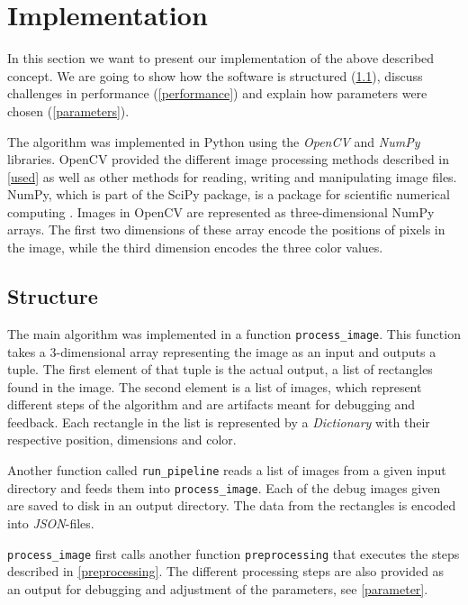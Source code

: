 \section{Implementation}

In this section we want to present our implementation of the above described
concept. We are going to show how the software is structured
(\ref{structure}), discuss challenges in performance (\ref{performance}) and
explain how parameters were chosen (\ref{parameters}).

The algorithm was implemented in Python using the \textit{OpenCV} and
\textit{NumPy} libraries. OpenCV provided the different image processing methods
described in \ref{used} as well as other methods for reading, writing and
manipulating image files. NumPy, which is part of the SciPy package, is a
package for scientific numerical computing \cite{scipy}. Images in OpenCV are
represented as three-dimensional NumPy arrays. The first two dimensions of these
array encode the positions of pixels in the image, while the third dimension
encodes the three color values.

\subsection{Structure} \label{structure}

The main algorithm was implemented in a function \texttt{process\_image}. This
function takes a 3-dimensional array representing the image as an input and
outputs a tuple. The first element of that tuple is the actual output, a list of
rectangles found in the image. The second element is a list of images, which
represent different steps of the algorithm and are artifacts meant for debugging
and feedback. Each rectangle in the list is represented by a \textit{Dictionary}
with their respective position, dimensions and color.

Another function called \texttt{run\_pipeline} reads a list of images from a
given input directory and feeds them into \texttt{process\_image}. Each of the
debug images given are saved to disk in an output directory. The data from the
rectangles is encoded into \textit{JSON}-files.


\texttt{process\_image} first calls another function \texttt{preprocessing} that
executes the steps described in \ref{preprocessing}. The different processing
steps are also provided as an output for debugging and adjustment of the
parameters, see \ref{parameter}.

